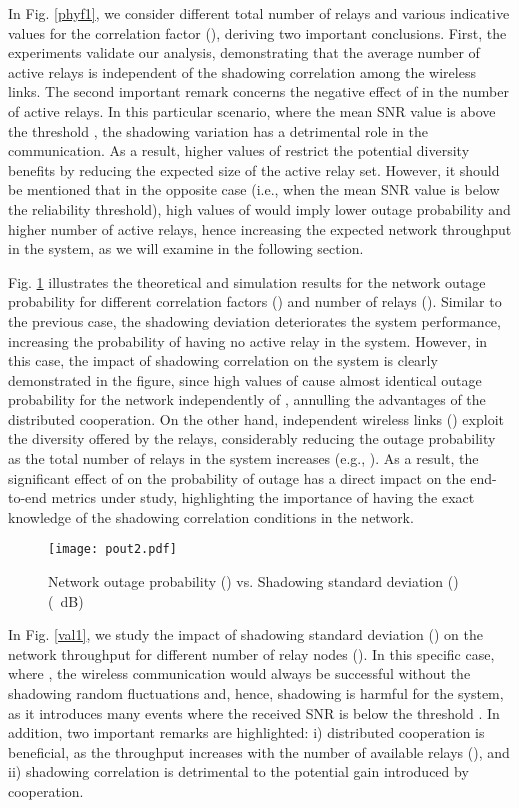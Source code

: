 \documentclass[12pt,draftcls, onecolumn]{IEEEtran}
\begin{document}
In Fig. \ref{phyf1}, we consider different total number of relays and various indicative values for the correlation factor (), deriving two important conclusions. First, the experiments validate our analysis, demonstrating that the average number of active relays is independent of the shadowing correlation among the wireless links. The second important remark concerns the negative effect of  in the number of active relays. In this particular scenario, where the mean SNR value is above the threshold , the shadowing variation has a detrimental role in the communication. As a result, higher values of  restrict the potential diversity benefits by reducing the expected size of the active relay set. However, it should be mentioned that in the opposite case (i.e., when the mean SNR value is below the reliability threshold), high values of  would imply lower outage probability and higher number of active relays, hence increasing the expected network throughput in the system, as we will examine in the following section.

Fig. \ref{phyf2} illustrates the theoretical and simulation results for the network outage probability for different correlation factors () and number of relays (). Similar to the previous case, the shadowing deviation deteriorates the system performance, increasing the probability of having no active relay in the system. However, in this case, the impact of shadowing correlation on the system is clearly demonstrated in the figure, since high values of  cause almost identical outage probability for the network independently of , annulling the advantages of the distributed cooperation. On the other hand, independent wireless links () exploit the diversity offered by the relays, considerably reducing the outage probability as the total number of relays in the system increases (e.g., ). As a result, the significant effect of  on the probability of outage has a direct impact on the end-to-end metrics under study, highlighting the importance of having the exact knowledge of the shadowing correlation conditions in the network.

\begin{figure}[htb]
\centering
\texttt{[image: pout2.pdf]}
\caption{Network outage probability () vs. Shadowing standard deviation () (~dB)}\label{phyf2}
\end{figure}

In Fig. \ref{val1}, we study the impact of shadowing standard deviation () on the network throughput for different number of relay nodes (). In this specific case, where , the wireless communication would always be successful without the shadowing random fluctuations and, hence, shadowing is harmful for the system, as it introduces many events where the received SNR is below the threshold . In addition, two important remarks are highlighted: i) distributed cooperation is beneficial, as the throughput increases with the number of available relays (), and ii) shadowing correlation is detrimental to the potential gain introduced by cooperation.
\end{document}
